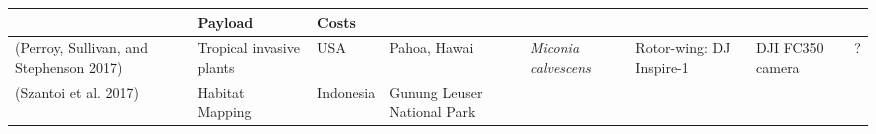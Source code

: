 \documentclass[]{interact}
\theoremstyle{plain}%
\theoremstyle{definition}
\theoremstyle{remark}
\begin{document}
\begin{longtable}[]{@{}llllllll@{}}
\begin{minipage}[b]{0.09\columnwidth}
\end{minipage} & \begin{minipage}[b]{0.11\columnwidth}\raggedright\strut
Payload\strut
\end{minipage} & \begin{minipage}[b]{0.01\columnwidth}\raggedright\strut
Costs\strut
\end{minipage}\tabularnewline
\midrule
\endhead
\begin{minipage}[t]{0.11\columnwidth}\raggedright\strut
(Perroy, Sullivan, and Stephenson 2017)\strut
\end{minipage} & \begin{minipage}[t]{0.18\columnwidth}\raggedright\strut
Tropical invasive plants\strut
\end{minipage} & \begin{minipage}[t]{0.03\columnwidth}\raggedright\strut
USA\strut
\end{minipage} & \begin{minipage}[t]{0.14\columnwidth}\raggedright\strut
Pahoa, Hawai\strut
\end{minipage} & \begin{minipage}[t]{0.10\columnwidth}\raggedright\strut
\emph{Miconia calvescens}\strut
\end{minipage} & \begin{minipage}[t]{0.09\columnwidth}\raggedright\strut
Rotor-wing: DJ Inspire-1\strut
\end{minipage} & \begin{minipage}[t]{0.11\columnwidth}\raggedright\strut
DJI FC350 camera\strut
\end{minipage} & \begin{minipage}[t]{0.01\columnwidth}\raggedright\strut
?\strut
\end{minipage}\tabularnewline
\begin{minipage}[t]{0.11\columnwidth}\raggedright\strut
(Szantoi et al. 2017)\strut
\end{minipage} & \begin{minipage}[t]{0.18\columnwidth}\raggedright\strut
Habitat Mapping\strut
\end{minipage} & \begin{minipage}[t]{0.03\columnwidth}\raggedright\strut
Indonesia\strut
\end{minipage} & \begin{minipage}[t]{0.14\columnwidth}\raggedright\strut
Gunung Leuser National Park\strut
\end{minipage} & \begin{minipage}[t]{0.10\columnwidth}\raggedright\strut

\end{minipage}
\end{longtable}
\end{document}
